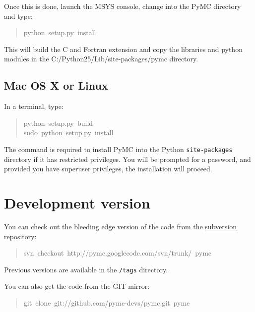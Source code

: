Once this is done, launch the MSYS console, change into the PyMC directory and
type:
\begin{quote}{\ttfamily \raggedright \noindent
python~setup.py~install
}\end{quote}

This will build the C and Fortran extension and copy the libraries and python
modules in the C:/Python25/Lib/site-packages/pymc directory.



\hypertarget{mac-os-x-or-linux}{}
\subsection{Mac OS X or Linux}
\label{mac-os-x-or-linux}

In a terminal, type:
\begin{quote}{\ttfamily \raggedright \noindent
python~setup.py~build~\\
sudo~python~setup.py~install
}\end{quote}

The  command is required to install PyMC into the Python \texttt{site-packages}
directory if it has restricted privileges. You will be prompted for a password,
and provided you have superuser privileges, the installation will proceed.



\hypertarget{development-version}{}
\section{Development version}
\label{development-version}

You can check out the bleeding edge version of the code from the \href{http://subversion.tigris.org/}{subversion}
repository:
\begin{quote}{\ttfamily \raggedright \noindent
svn~checkout~http://pymc.googlecode.com/svn/trunk/~pymc
}\end{quote}

Previous versions are available in the \texttt{/tags} directory.

You can also get the code from the GIT mirror:
\begin{quote}{\ttfamily \raggedright \noindent
git~clone~git://github.com/pymc-devs/pymc.git~pymc
}\end{quote}


